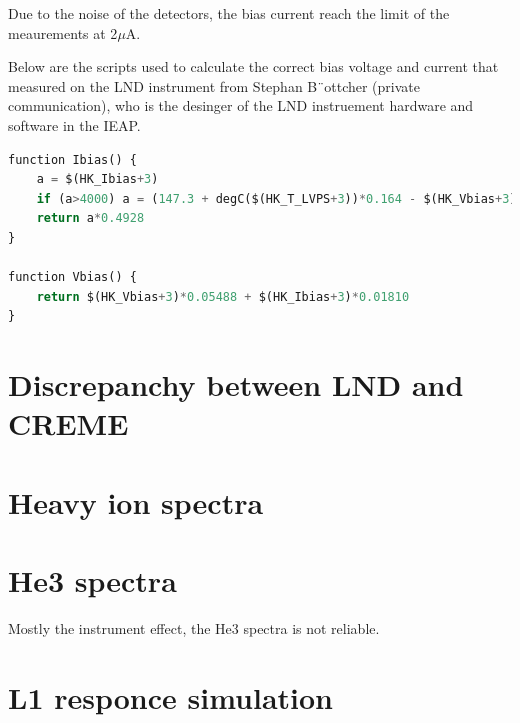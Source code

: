     Due to the noise of the detectors, the bias current reach the limit of the meaurements at 2$\mu$A. 

Below are the scripts used to calculate the correct bias voltage and current that measured on the LND instrument from Stephan B¨ottcher (private communication), who is the desinger of the LND instruement hardware and software in the IEAP.
\begin{lstlisting}[language=Python]
function Ibias() {
    a = $(HK_Ibias+3)
    if (a>4000) a = (147.3 + degC($(HK_T_LVPS+3))*0.164 - $(HK_Vbias+3)*0.05488) / 0.01810
    return a*0.4928
}

function Vbias() {
    return $(HK_Vbias+3)*0.05488 + $(HK_Ibias+3)*0.01810
}

\end{lstlisting}

\section{Discrepanchy between LND and CREME}

\section{Heavy ion spectra}

\section{He3 spectra}
Mostly the instrument effect, the He3 spectra is not reliable.

\section{L1 responce simulation}

